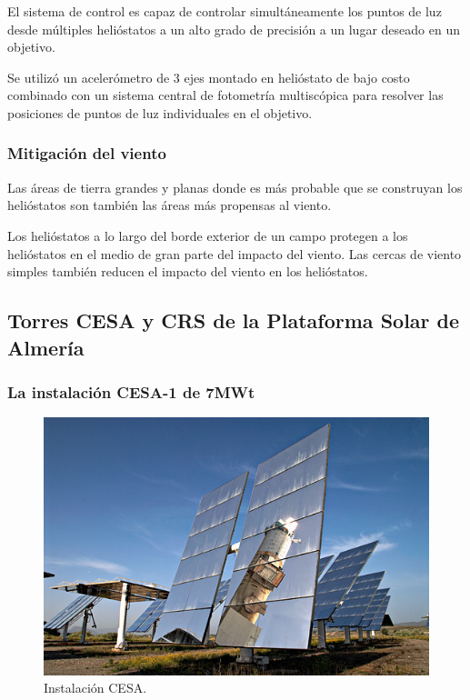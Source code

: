 El sistema de control es capaz de controlar simultáneamente los puntos de luz desde múltiples helióstatos a un alto grado de precisión a un lugar deseado en un objetivo.

Se utilizó un acelerómetro de 3 ejes montado en helióstato de bajo costo combinado con un sistema central de fotometría multiscópica para resolver las posiciones de puntos de luz individuales en el objetivo.

\subsubsection{Mitigación del viento}

Las áreas de tierra grandes y planas donde es más probable que se construyan los helióstatos son también las áreas más propensas al viento.

Los helióstatos a lo largo del borde exterior de un campo protegen a los helióstatos en el medio de gran parte del impacto del viento. Las cercas de viento simples también reducen el impacto del viento en los helióstatos. \cite{GoogleWebSite}



\subsection{Torres CESA y CRS de la Plataforma Solar de Almería}

\subsubsection{La instalación CESA-1 de 7MWt}

\begin{figure}[h!]
  	\centering
	\includegraphics[width=\textwidth]{FotosPaginasWebHeliostatos/unnamed(4).png}
	\caption{Instalación CESA.~\cite{PSA1WebSite}
	\label{fig:FotosPaginasWebHeliostatos/unnamed(4).png}}
\end{figure}

